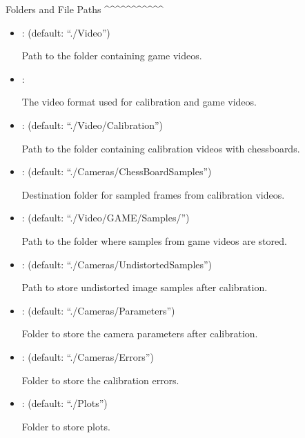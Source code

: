\documentclass[letterpaper,10pt,english]{sphinxmanual}
\begin{document}
\sphinxAtStartPar
Folders and File Paths
\textasciicircum{}\textasciicircum{}\textasciicircum{}\textasciicircum{}\textasciicircum{}\textasciicircum{}\textasciicircum{}\textasciicircum{}\textasciicircum{}\textasciicircum{}\textasciicircum{}\sphinxhyphen{}
\begin{itemize}
\item {} 
\sphinxAtStartPar
{}:  (default: “./Video”)

\sphinxAtStartPar
Path to the folder containing game videos.

\item {} 
\sphinxAtStartPar
{}: 

\sphinxAtStartPar
The video format used for calibration and game videos.

\item {} 
\sphinxAtStartPar
{}:  (default: “./Video/Calibration”)

\sphinxAtStartPar
Path to the folder containing calibration videos with chessboards.

\item {} 
\sphinxAtStartPar
{}:  (default: “./Cameras/ChessBoardSamples”)

\sphinxAtStartPar
Destination folder for sampled frames from calibration videos.

\item {} 
\sphinxAtStartPar
{}:  (default: “./Video/GAME/Samples/”)

\sphinxAtStartPar
Path to the folder where samples from game videos are stored.

\item {} 
\sphinxAtStartPar
{}:  (default: “./Cameras/UndistortedSamples”)

\sphinxAtStartPar
Path to store undistorted image samples after calibration.

\item {} 
\sphinxAtStartPar
{}:  (default: “./Cameras/Parameters”)

\sphinxAtStartPar
Folder to store the camera parameters after calibration.

\item {} 
\sphinxAtStartPar
{}:  (default: “./Cameras/Errors”)

\sphinxAtStartPar
Folder to store the calibration errors.

\item {} 
\sphinxAtStartPar
{}:  (default: “./Plots”)

\sphinxAtStartPar
Folder to store plots.

\end{itemize}
\end{document}
